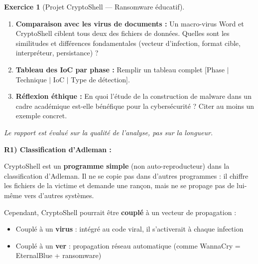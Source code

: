 \documentclass[a4paper,11pt]{article}
\theoremstyle{plain}
\theoremstyle{definition}
\newtheorem{exercice}{Exercice}
\begin{document}
\begin{exercice}[Projet CryptoShell --- Ransomware éducatif]
\begin{enumerate}
\item[\textbf{R4)}] \textbf{Comparaison avec les virus de documents :} Un macro-virus Word et CryptoShell ciblent tous deux des fichiers de données. Quelles sont les similitudes et différences fondamentales (vecteur d'infection, format cible, interpréteur, persistance) ?

\item[\textbf{R5)}] \textbf{Tableau des IoC par phase :} Remplir un tableau complet [Phase $|$ Technique $|$ IoC $|$ Type de détection].

\item[\textbf{R6)}] \textbf{Réflexion éthique :} En quoi l'étude de la construction de malware dans un cadre académique est-elle bénéfique pour la cybersécurité ? Citer au moins un exemple concret.
\end{enumerate}

\medskip
\noindent\textit{Le rapport est évalué sur la qualité de l'analyse, pas sur la longueur.}

\begin{correction}

\textbf{R1) Classification d'Adleman :}

CryptoShell est un \textbf{programme simple} (non auto-reproducteur) dans la classification d'Adleman. Il ne se copie pas dans d'autres programmes : il chiffre les fichiers de la victime et demande une rançon, mais ne se propage pas de lui-même vers d'autres systèmes.

Cependant, CryptoShell pourrait être \textbf{couplé} à un vecteur de propagation :
\begin{itemize}
    \item Couplé à un \textbf{virus} : intégré au code viral, il s'activerait à chaque infection
    \item Couplé à un \textbf{ver} : propagation réseau automatique (comme WannaCry = EternalBlue + ransomware)
\end{itemize}


\end{correction}
\end{exercice}
\end{document}
